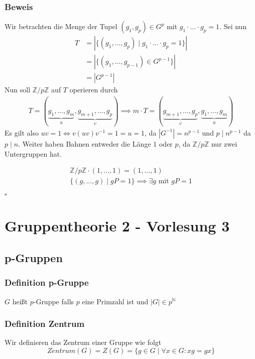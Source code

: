 \documentclass[12pt, german]{article}
\newcommand{\bewiesen}{

\begin{flushright}
		$\square$  \\
\end{flushright}}
\begin{document}
\subsubsection{Beweis}
	Wir betrachten die Menge der Tupel $(g_1, g_p) \in G^p$ mit $g_1 \cdot \ldots \cdot g_p = 1$. 
	Sei nun 
	\begin{align*}
		T &= |\{(g_1, \ldots, g_p) \mid  g_1 \cdot \ldots \cdot g_p = 1 \}| \\
		&= |\{(g_1, \ldots, g_{p-1}) \in G^{p-1} \}| \\
		&= |G^{p-1}|
	\end{align*}
	Nun soll $\mathbb Z /p\mathbb Z$ auf $T$ operieren durch
	 \begin{align*}
		T = (\underbrace{g_1, \ldots, g_m}_{\substack{u}}, \underbrace{g_{m+1}, \ldots, g_p}_{\substack{v}}) \implies m\cdot T = (\underbrace{g_{m+1}, \ldots, g_p}_{\substack{v}}, \underbrace{g_1, \ldots, g_m}_{\substack{u}})
	\end{align*}
	Es gilt also $uv = 1 \iff v(uv)v^{-1} = 1 = u = 1$, da $|G^{-1}| = n^{p-1}$ und $p \mid n^{p-1} $ da $p \mid n$.
	Weiter haben Bahnen entweder die Länge $1$ oder $p$, da $\mathbb Z /p\mathbb Z$ nur zwei Untergruppen hat.

	\begin{align*}
		\mathbb Z /p\mathbb Z \cdot (1, \ldots, 1) = (1, \ldots, 1) \\
		\{(g, \ldots, g) \mid gP= 1 \} \implies \exists g \text{ mit } gP = 1
	\end{align*}
\bewiesen

\section{Gruppentheorie 2 - Vorlesung 3}
\subsection{p-Gruppen}
\subsubsection{Definition p-Gruppe}
	$G$ heißt $p$-Gruppe falls $p$ eine Primzahl ist und $|G| \in p^{\mathbb N}$

\subsubsection{Definition Zentrum}
	Wir definieren das Zentrum einer Gruppe wie folgt $$Zentrum(G)= Z(G) = \{g \in G \mid  \forall x \in G: xg = gx\}$$
\end{document}
